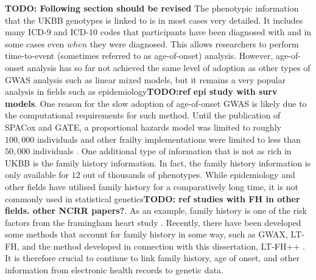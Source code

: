 \textbf{TODO: Following section should be revised}
The phenotypic information that the UKBB genotypes is linked to is in most cases very detailed. It includes many ICD-9 and ICD-10 codes that participants have been diagnosed with and in some cases even $ when $ they were diagnosed. This allows researchers to perform time-to-event (sometimes referred to as age-of-onset) analysis. However, age-of-onset analysis has so far not achieved the same level of adoption as other types of GWAS analysis such as linear mixed models, but it remains a very popular analysis in fields such as epidemiology\textbf{TODO:ref epi study with surv models}. One reason for the slow adoption of age-of-onset GWAS is likely due to the  computational requirements for such method. Until the publication of SPACox\cite{bi2020fast} and GATE\cite{dey2022efficient}, a proportional hazards model was limited to roughly $ 100,000 $ individuals and other frailty implementations were limited to less than $ 50,000 $ individuals \cite{rizvi2019gwasurvivr,syed2017survivalgwas_sv,he2020fast}. One additional type of information that is not as rich in UKBB is the family history information. In fact, the family history information is only available for $ 12 $ out of thousands of phenotypes. While epidemiology and other fields have utilised family history for a comparatively long time, it is not commonly used in statistical genetics\textbf{TODO: ref studies with FH in other fields. other NCRR papers?}. As an example, family history is one of the risk factors from the framingham heart study \cite{splansky2007third,kannel1990contribution}. Recently, there have been developed some methods that account for family history in some way, such as GWAX, LT-FH, and the method developed in connection with this dissertation, LT-FH++ \cite{gwax,hujoel2020liability,pedersen2022accounting}. It is therefore crucial to continue to link family history, age of onset, and other information from electronic health records to genetic data. 
